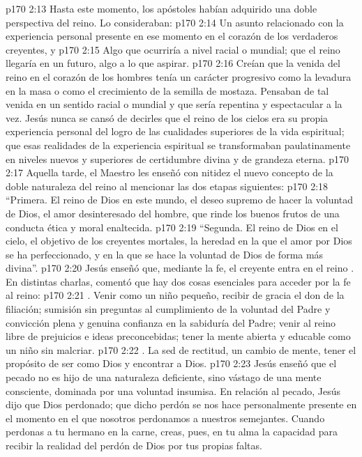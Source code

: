 \vs p170 2:13 Hasta este momento, los apóstoles habían adquirido una doble perspectiva del reino. Lo consideraban:
\vs p170 2:14 Un asunto relacionado con la experiencia personal presente en ese momento en el corazón de los verdaderos creyentes, y
\vs p170 2:15 Algo que ocurriría a nivel racial o mundial; que el reino llegaría en un futuro, algo a lo que aspirar.
\vs p170 2:16 \pc Creían que la venida del reino en el corazón de los hombres tenía un carácter progresivo como la levadura en la masa o como el crecimiento de la semilla de mostaza. Pensaban de tal venida en un sentido racial o mundial y que sería repentina y espectacular a la vez. Jesús nunca se cansó de decirles que el reino de los cielos era su propia experiencia personal del logro de las cualidades superiores de la vida espiritual; que esas realidades de la experiencia espiritual se transformaban paulatinamente en niveles nuevos y superiores de certidumbre divina y de grandeza eterna.
\vs p170 2:17 Aquella tarde, el Maestro les enseñó con nitidez el nuevo concepto de la doble naturaleza del reino al mencionar las dos etapas siguientes:
\vs p170 2:18 “Primera. El reino de Dios en este mundo, el deseo supremo de hacer la voluntad de Dios, el amor desinteresado del hombre, que rinde los buenos frutos de una conducta ética y moral enaltecida.
\vs p170 2:19 “Segunda. El reino de Dios en el cielo, el objetivo de los creyentes mortales, la heredad en la que el amor por Dios se ha perfeccionado, y en la que se hace la voluntad de Dios de forma más divina”.
\vs p170 2:20 Jesús enseñó que, mediante la fe, el creyente entra en el reino . En distintas charlas, comentó que hay dos cosas esenciales para acceder por la fe al reino:
\vs p170 2:21 . Venir como un niño pequeño, recibir de gracia el don de la filiación; sumisión sin preguntas al cumplimiento de la voluntad del Padre y convicción plena y genuina confianza en la sabiduría del Padre; venir al reino libre de prejuicios e ideas preconcebidas; tener la mente abierta y educable como un niño sin malcriar.
\vs p170 2:22 . La sed de rectitud, un cambio de mente, tener el propósito de ser como Dios y encontrar a Dios.
\vs p170 2:23 Jesús enseñó que el pecado no es hijo de una naturaleza deficiente, sino vástago de una mente consciente, dominada por una voluntad insumisa. En relación al pecado, Jesús dijo que Dios  perdonado; que dicho perdón se nos hace personalmente presente en el momento en el que nosotros perdonamos a nuestros semejantes. Cuando perdonas a tu hermano en la carne, creas, pues, en tu alma la capacidad para recibir la realidad del perdón de Dios por tus propias faltas.
